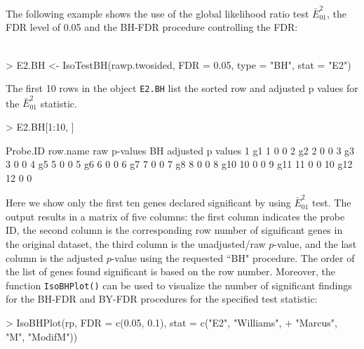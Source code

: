 \documentclass[10pt]{mybook4}
\begin{document}
The following example shows the use of the global likelihood ratio
test $\bar{E}^{2}_{01}$, the FDR level of 0.05 and the BH-FDR
procedure controlling the FDR: \\ \\

\begin{Schunk}
\begin{Sinput}
> E2.BH <- IsoTestBH(rawp.twosided, FDR = 0.05, type = "BH", stat = "E2")
\end{Sinput}
\end{Schunk}

The first 10 rows in the object \texttt{E2.BH} list the sorted row and adjusted p values for the $\bar{E}^{2}_{01}$ statistic.

\begin{Schunk}
\begin{Sinput}
> E2.BH[1:10, ]
\end{Sinput}
\begin{Soutput}
   Probe.ID row.name raw p-values BH adjusted p values
1        g1        1            0                    0
2        g2        2            0                    0
3        g3        3            0                    0
4        g5        5            0                    0
5        g6        6            0                    0
6        g7        7            0                    0
7        g8        8            0                    0
8       g10       10            0                    0
9       g11       11            0                    0
10      g12       12            0                    0
\end{Soutput}
\end{Schunk}

Here we show only the first ten genes declared significant by using
$\bar{E}^{2}_{01}$ test. The output results in a matrix of five
columns: the first column indicates the probe ID, the second column
is the corresponding row number of significant genes in the original
dataset, the third column is the unadjusted/raw $p$-value, and the
last column is the adjusted $p$-value using the requested ``BH"
procedure. The order of the list of genes found significant is based
on the row number. Moreover, the function \texttt{IsoBHPlot()} can
be used to visualize the number of significant findings for the
BH-FDR and BY-FDR procedures for the specified test statistic:

\begin{Schunk}
\begin{Sinput}
> IsoBHPlot(rp, FDR = c(0.05, 0.1), stat = c("E2", "Williams", 
+     "Marcus", "M", "ModifM"))
\end{Sinput}
\end{Schunk}
\end{document}
